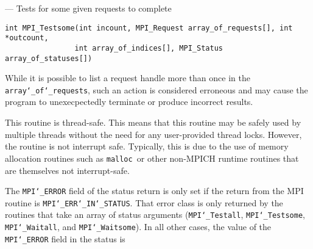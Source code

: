 \startmanpage
{}
--- Tests for some given requests to complete 
\startvb\begin{verbatim}
int MPI_Testsome(int incount, MPI_Request array_of_requests[], int *outcount, 
                int array_of_indices[], MPI_Status array_of_statuses[])

\end{verbatim}
\endvb

\par
{}
\par
{}
\par
While it is possible to list a request handle more than once in the
{\tt array{\tt \char`\_}of{\tt \char`\_}requests}, such an action is considered erroneous and may cause the
program to unexecpectedly terminate or produce incorrect results.
\par
{}
\par
This routine is thread-safe.  This means that this routine may be
safely used by multiple threads without the need for any user-provided
thread locks.  However, the routine is not interrupt safe.  Typically,
this is due to the use of memory allocation routines such as {\tt malloc
}or other non-MPICH runtime routines that are themselves not interrupt-safe.
\par
{}
\par
The {\tt MPI{\tt \char`\_}ERROR} field of the status return is only set if
the return from the MPI routine is {\tt MPI{\tt \char`\_}ERR{\tt \char`\_}IN{\tt \char`\_}STATUS}.  That error class
is only returned by the routines that take an array of status arguments
({\tt MPI{\tt \char`\_}Testall}, {\tt MPI{\tt \char`\_}Testsome}, {\tt MPI{\tt \char`\_}Waitall}, and {\tt MPI{\tt \char`\_}Waitsome}).  In
all other cases, the value of the {\tt MPI{\tt \char`\_}ERROR} field in the status is
